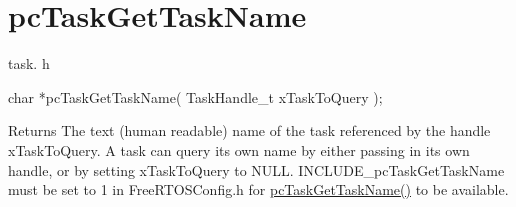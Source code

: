 \hypertarget{group__pc_task_get_task_name}{}\section{pc\+Task\+Get\+Task\+Name}
\label{group__pc_task_get_task_name}
task. h 
\begin{DoxyPre}char *pcTaskGetTaskName( TaskHandle\_t xTaskToQuery );\end{DoxyPre}


\begin{DoxyReturn}{Returns}
The text (human readable) name of the task referenced by the handle x\+Task\+To\+Query. A task can query its own name by either passing in its own handle, or by setting x\+Task\+To\+Query to N\+U\+LL. I\+N\+C\+L\+U\+D\+E\+\_\+pc\+Task\+Get\+Task\+Name must be set to 1 in Free\+R\+T\+O\+S\+Config.\+h for \hyperlink{vendor_2ceedling_2plugins_2freertos_2src_2freertos_2include_2task_8h_a4344bd56963429dfa26b0af913349e84}{pc\+Task\+Get\+Task\+Name()} to be available. 
\end{DoxyReturn}
